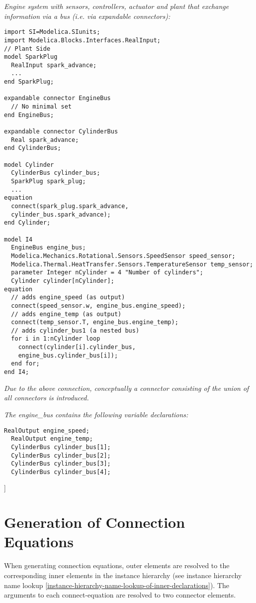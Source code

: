 \emph{Engine system with sensors, controllers, actuator and plant that
exchange information via a bus (i.e. via expandable connectors):}
\begin{lstlisting}[language=modelica]
import SI=Modelica.SIunits;
import Modelica.Blocks.Interfaces.RealInput;
// Plant Side
model SparkPlug
  RealInput spark_advance;
  ...
end SparkPlug;

expandable connector EngineBus
  // No minimal set
end EngineBus;

expandable connector CylinderBus
  Real spark_advance;
end CylinderBus;

model Cylinder
  CylinderBus cylinder_bus;
  SparkPlug spark_plug;
  ...
equation
  connect(spark_plug.spark_advance,
  cylinder_bus.spark_advance);
end Cylinder;

model I4
  EngineBus engine_bus;
  Modelica.Mechanics.Rotational.Sensors.SpeedSensor speed_sensor;
  Modelica.Thermal.HeatTransfer.Sensors.TemperatureSensor temp_sensor;
  parameter Integer nCylinder = 4 "Number of cylinders";
  Cylinder cylinder[nCylinder];
equation
  // adds engine_speed (as output)
  connect(speed_sensor.w, engine_bus.engine_speed);
  // adds engine_temp (as output)
  connect(temp_sensor.T, engine_bus.engine_temp);
  // adds cylinder_bus1 (a nested bus)
  for i in 1:nCylinder loop
    connect(cylinder[i].cylinder_bus,
    engine_bus.cylinder_bus[i]);
  end for;
end I4;
\end{lstlisting}
\emph{Due to the above connection, conceptually a connector consisting
of the union of all connectors is introduced.}

\emph{The engine\_bus contains the following variable declarations:}
\begin{lstlisting}[language=modelica]
  RealOutput engine_speed;
  RealOutput engine_temp;
  CylinderBus cylinder_bus[1];
  CylinderBus cylinder_bus[2];
  CylinderBus cylinder_bus[3];
  CylinderBus cylinder_bus[4];
\end{lstlisting}
{]}

\section{Generation of Connection Equations}

When generating connection equations, outer elements are resolved to the
corresponding inner elements in the instance hierarchy (see instance
hierarchy name lookup \ref{instance-hierarchy-name-lookup-of-inner-declarations}). The arguments to each connect-equation are
resolved to two connector elements.

